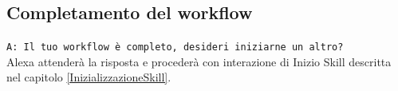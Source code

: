 \subsection{Completamento del workflow}
\texttt{A: Il tuo workflow è completo, desideri iniziarne un altro?}\\
Alexa attenderà la risposta e procederà con interazione di Inizio Skill descritta nel capitolo \ref{InizializzazioneSkill}.
